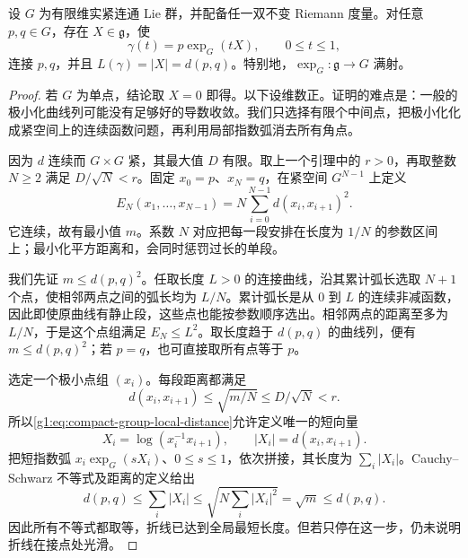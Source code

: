 \begin{theorem}\label{g1:thm:compact-exp-surjective}
	设 \(G\) 为有限维实紧连通 Lie 群，并配备任一双不变 Riemann 度量。对任意 \(p,q\in G\)，存在 \(X\in\mathfrak g\)，使
	\[
		\gamma(t)=p\exp_G(tX),\qquad 0\le t\le1,
	\]
	连接 \(p,q\)，并且 \(L(\gamma)=|X|=d(p,q)\)。特别地，\(\exp_G:\mathfrak g\to G\) 满射。
\end{theorem}
\begin{proof}
	若 \(G\) 为单点，结论取 \(X=0\) 即得。以下设维数正。证明的难点是：一般的极小化曲线列可能没有足够好的导数收敛。我们只选择有限个中间点，把极小化化成紧空间上的连续函数问题，再利用局部指数弧消去所有角点。

	因为 \(d\) 连续而 \(G\times G\) 紧，其最大值 \(D\) 有限。取上一个引理中的 \(r>0\)，再取整数 \(N\ge2\) 满足 \(D/\sqrt N<r\)。固定 \(x_0=p\)、\(x_N=q\)，在紧空间 \(G^{N-1}\) 上定义
	\[
		E_N(x_1,\ldots,x_{N-1})
		=N\sum_{i=0}^{N-1}d(x_i,x_{i+1})^2.
	\]
	它连续，故有最小值 \(m\)。系数 \(N\) 对应把每一段安排在长度为 \(1/N\) 的参数区间上；最小化平方距离和，会同时惩罚过长的单段。

	我们先证 \(m\le d(p,q)^2\)。任取长度 \(L>0\) 的连接曲线，沿其累计弧长选取 \(N+1\) 个点，使相邻两点之间的弧长均为 \(L/N\)。累计弧长是从 \(0\) 到 \(L\) 的连续非减函数，因此即使原曲线有静止段，这些点也能按参数顺序选出。相邻两点的距离至多为 \(L/N\)，于是这个点组满足 \(E_N\le L^2\)。取长度趋于 \(d(p,q)\) 的曲线列，便有 \(m\le d(p,q)^2\)；若 \(p=q\)，也可直接取所有点等于 \(p\)。

	选定一个极小点组 \((x_i)\)。每段距离都满足
	\[
		d(x_i,x_{i+1})\le\sqrt{m/N}\le D/\sqrt N<r.
	\]
	所以\eqref{g1:eq:compact-group-local-distance}允许定义唯一的短向量
	\[
		X_i=\log(x_i^{-1}x_{i+1}),\qquad
		|X_i|=d(x_i,x_{i+1}).
	\]
	把短指数弧 \(x_i\exp_G(sX_i)\)、\(0\le s\le1\)，依次拼接，其长度为 \(\sum_i|X_i|\)。Cauchy--Schwarz 不等式及距离的定义给出
	\[
		d(p,q)\le\sum_i|X_i|
		\le\sqrt{N\sum_i|X_i|^2}=\sqrt m\le d(p,q).
	\]
	因此所有不等式都取等，折线已达到全局最短长度。但若只停在这一步，仍未说明折线在接点处光滑。


\end{proof}
